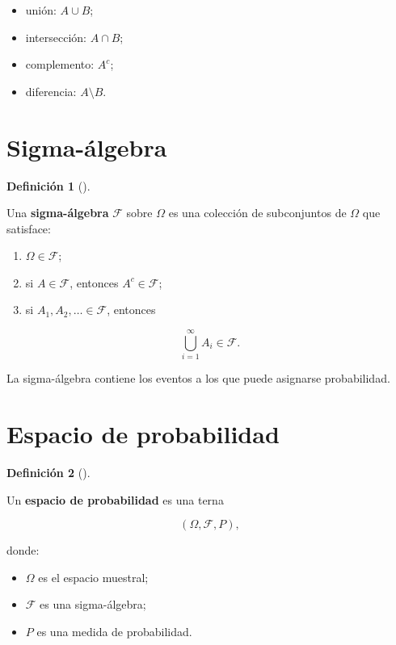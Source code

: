 \documentclass[
  spanish,
  10.5pt,
  letterpaper,
  DIV=11,
  numbers=noendperiod,
  oneside,
  open=any]{scrreprt}
\providecommand{\tightlist}{%
  \setlength{\itemsep}{0pt}\setlength{\parskip}{0pt}}
\theoremstyle{definition}
\newtheorem{definition}{Definición}[chapter]
\theoremstyle{definition}
\theoremstyle{plain}
\theoremstyle{remark}
\begin{document}
\begin{itemize}
\tightlist
\item
  unión: \(A\cup B\);
\item
  intersección: \(A\cap B\);
\item
  complemento: \(A^c\);
\item
  diferencia: \(A\setminus B\).
\end{itemize}

\section*{Sigma-álgebra}\label{sigma-uxe1lgebra}


\begin{definition}[]\protect\hypertarget{def-sigma-algebra}{}\label{def-sigma-algebra}

Una \textbf{sigma-álgebra} \(\mathcal{F}\) sobre \(\Omega\) es una
colección de subconjuntos de \(\Omega\) que satisface:

\begin{enumerate}
\def\labelenumi{\arabic{enumi}.}
\tightlist
\item
  \(\Omega\in\mathcal{F}\);
\item
  si \(A\in\mathcal{F}\), entonces \(A^c\in\mathcal{F}\);
\item
  si \(A_1,A_2,\ldots\in\mathcal{F}\), entonces
\end{enumerate}

\[
\bigcup_{i=1}^{\infty}A_i\in\mathcal{F}.
\]

\end{definition}

La sigma-álgebra contiene los eventos a los que puede asignarse
probabilidad.

\section*{Espacio de probabilidad}\label{espacio-de-probabilidad}


\begin{definition}[]\protect\hypertarget{def-espacio-probabilidad}{}\label{def-espacio-probabilidad}

Un \textbf{espacio de probabilidad} es una terna

\[
(\Omega,\mathcal{F},P),
\]

donde:

\begin{itemize}
\tightlist
\item
  \(\Omega\) es el espacio muestral;
\item
  \(\mathcal{F}\) es una sigma-álgebra;
\item
  \(P\) es una medida de probabilidad.
\end{itemize}

\end{definition}
\end{document}
